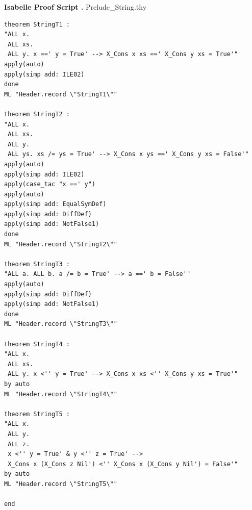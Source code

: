 \documentclass[12pt,twoside]{article}
\numberwithin{spec}{subsection}
\numberwithin{proof}{subsection}
\numberwithin{figure}{subsection}
\numberwithin{code}{subsection}
\begin{document}
\begin{multicols}{2}
\addtocounter{appindex}{1}
\large{\textbf{Isabelle Proof Script \thesection{}.\theappindex{}} Prelude\_String.thy}
\label{pscript:String}
\tiny
\begin{verbatim}
theorem StringT1 :
"ALL x.
 ALL xs.
 ALL y. x ==' y = True' --> X_Cons x xs ==' X_Cons y xs = True'"
apply(auto)
apply(simp add: ILE02)
done
ML "Header.record \"StringT1\""

theorem StringT2 :
"ALL x.
 ALL xs.
 ALL y.
 ALL ys. xs /= ys = True' --> X_Cons x ys ==' X_Cons y xs = False'"
apply(auto)
apply(simp add: ILE02)
apply(case_tac "x ==' y")
apply(auto)
apply(simp add: EqualSymDef)
apply(simp add: DiffDef)
apply(simp add: NotFalse1)
done
ML "Header.record \"StringT2\""

theorem StringT3 :
"ALL a. ALL b. a /= b = True' --> a ==' b = False'"
apply(auto)
apply(simp add: DiffDef)
apply(simp add: NotFalse1)
done
ML "Header.record \"StringT3\""

theorem StringT4 :
"ALL x.
 ALL xs.
 ALL y. x <'' y = True' --> X_Cons x xs <'' X_Cons y xs = True'"
by auto
ML "Header.record \"StringT4\""

theorem StringT5 :
"ALL x.
 ALL y.
 ALL z.
 x <'' y = True' & y <'' z = True' -->
 X_Cons x (X_Cons z Nil') <'' X_Cons x (X_Cons y Nil') = False'"
by auto
ML "Header.record \"StringT5\""

end
\end{verbatim}
\end{multicols}
\end{document}
